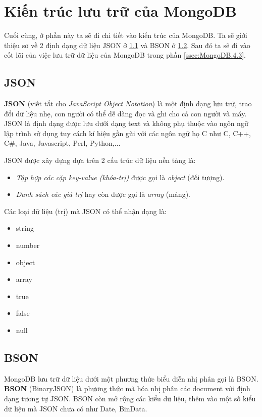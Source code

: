 \section{Kiến trúc lưu trữ của MongoDB} \label{sec:MongoDB.4}
Cuối cùng, ở phần này ta sẽ đi chi tiết vào kiến trúc của MongoDB. Ta sẽ giới thiệu sơ về 2 định dạng dữ liệu JSON ở \ref{ssec:MongoDB.4.1} và BSON ở \ref{ssec:MongoDB.4.2}. Sau đó ta sẽ đi vào cốt lõi của việc lưu trữ dữ liệu của MongoDB trong phần \ref{ssec:MongoDB.4.3}.
\subsection{JSON} \label{ssec:MongoDB.4.1}
\textbf{JSON} (viết tắt cho \textit{JavaScript Object Notation}) là một định dạng lưu trữ, trao đổi dữ liệu nhẹ, con người có thể dễ dàng đọc và ghi cho cả con người và máy. JSON là định dạng được lưu dưới dạng text và không phụ thuộc vào ngôn ngữ lập trình sử dụng tuy cách kí hiệu gần gũi với các ngôn ngữ họ C như C, C++, C\#, Java, Javascript, Perl, Python,...

JSON được xây dựng dựa trên 2 cấu trúc dữ liệu nền tảng là:
\begin{itemize}
\item \textit{Tập hợp các cặp key-value (khóa-trị)} được gọi là \textit{object} (đối tượng).
\item \textit{Danh sách các giá trị} hay còn được gọi là \textit{array} (mảng).
\end{itemize}
Các loại dữ liệu (trị) mà JSON có thể nhận dạng là:
\begin{itemize}
\item string
\item number
\item object
\item array
\item true
\item false
\item null
\end{itemize}
\subsection{BSON} \label{ssec:MongoDB.4.2}
MongoDB lưu trữ dữ liệu dưới một phương thức biểu diễn nhị phân gọi là BSON. \textbf{BSON} (BinaryJSON) là phương thức mã hóa nhị phân các document với định dạng tương tự JSON. BSON còn mở rộng các kiểu dữ liệu, thêm vào một số kiểu dữ liệu mà JSON chưa có như Date, BinData.

